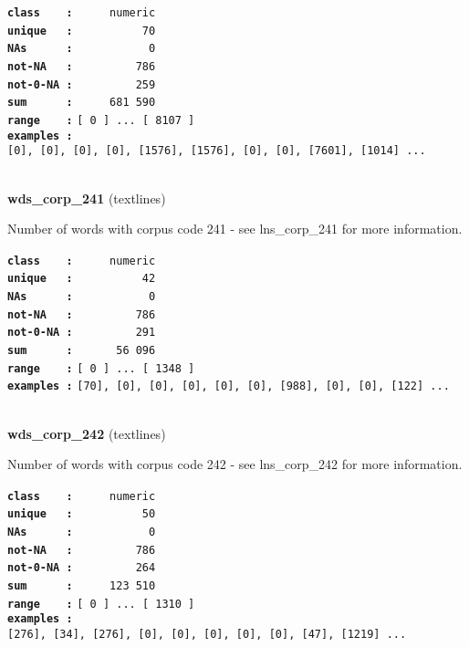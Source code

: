 \documentclass[]{article}
\begin{document}
\textbf{\texttt{class\ \ \ \ :}} \texttt{~~~~~numeric}\\
\textbf{\texttt{unique\ \ \ :}} \texttt{~~~~~~~~~~70}\\
\textbf{\texttt{NAs\ \ \ \ \ \ :}} \texttt{~~~~~~~~~~~0}\\
\textbf{\texttt{not-NA\ \ \ :}} \texttt{~~~~~~~~~786}\\
\textbf{\texttt{not-0-NA\ :}} \texttt{~~~~~~~~~259}\\
\textbf{\texttt{sum\ \ \ \ \ \ :}} \texttt{~~~~~681~590}\\
\textbf{\texttt{range\ \ \ \ :}}
\texttt{{[}\ 0\ {]}\ ...\ {[}\ 8107\ {]}}\\
\textbf{\texttt{examples\ :}}
\texttt{{[}0{]},\ {[}0{]},\ {[}0{]},\ {[}0{]},\ {[}1576{]},\ {[}1576{]},\ {[}0{]},\ {[}0{]},\ {[}7601{]},\ {[}1014{]}\ ...}\\

~

\textbf{wds\_corp\_241} (textlines)

Number of words with corpus code 241 - see lns\_corp\_241 for more
information.

\textbf{\texttt{class\ \ \ \ :}} \texttt{~~~~~numeric}\\
\textbf{\texttt{unique\ \ \ :}} \texttt{~~~~~~~~~~42}\\
\textbf{\texttt{NAs\ \ \ \ \ \ :}} \texttt{~~~~~~~~~~~0}\\
\textbf{\texttt{not-NA\ \ \ :}} \texttt{~~~~~~~~~786}\\
\textbf{\texttt{not-0-NA\ :}} \texttt{~~~~~~~~~291}\\
\textbf{\texttt{sum\ \ \ \ \ \ :}} \texttt{~~~~~~56~096}\\
\textbf{\texttt{range\ \ \ \ :}}
\texttt{{[}\ 0\ {]}\ ...\ {[}\ 1348\ {]}}\\
\textbf{\texttt{examples\ :}}
\texttt{{[}70{]},\ {[}0{]},\ {[}0{]},\ {[}0{]},\ {[}0{]},\ {[}0{]},\ {[}988{]},\ {[}0{]},\ {[}0{]},\ {[}122{]}\ ...}\\

~

\textbf{wds\_corp\_242} (textlines)

Number of words with corpus code 242 - see lns\_corp\_242 for more
information.

\textbf{\texttt{class\ \ \ \ :}} \texttt{~~~~~numeric}\\
\textbf{\texttt{unique\ \ \ :}} \texttt{~~~~~~~~~~50}\\
\textbf{\texttt{NAs\ \ \ \ \ \ :}} \texttt{~~~~~~~~~~~0}\\
\textbf{\texttt{not-NA\ \ \ :}} \texttt{~~~~~~~~~786}\\
\textbf{\texttt{not-0-NA\ :}} \texttt{~~~~~~~~~264}\\
\textbf{\texttt{sum\ \ \ \ \ \ :}} \texttt{~~~~~123~510}\\
\textbf{\texttt{range\ \ \ \ :}}
\texttt{{[}\ 0\ {]}\ ...\ {[}\ 1310\ {]}}\\
\textbf{\texttt{examples\ :}}
\texttt{{[}276{]},\ {[}34{]},\ {[}276{]},\ {[}0{]},\ {[}0{]},\ {[}0{]},\ {[}0{]},\ {[}0{]},\ {[}47{]},\ {[}1219{]}\ ...}\\
\end{document}
